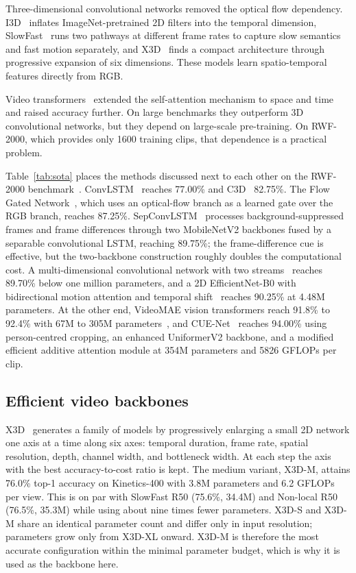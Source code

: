 \documentclass[conference]{IEEEtran}
\begin{document}
Three-dimensional convolutional networks removed the optical flow
dependency. I3D~\cite{i3d} inflates ImageNet-pretrained 2D filters
into the temporal dimension, SlowFast~\cite{slowfast} runs two
pathways at different frame rates to capture slow semantics and fast
motion separately, and X3D~\cite{x3d} finds a compact architecture
through progressive expansion of six dimensions. These models learn
spatio-temporal features directly from RGB.

Video transformers~\cite{timesformer,videoswin} extended the
self-attention mechanism to space and time and raised accuracy further.
On large benchmarks they outperform 3D convolutional networks, but they
depend on large-scale pre-training. On RWF-2000, which provides only
1600 training clips, that dependence is a practical problem.

Table~\ref{tab:sota} places the methods discussed next to each other
on the RWF-2000 benchmark~\cite{rwf2000}. ConvLSTM~\cite{convlstm}
reaches 77.00\% and C3D~\cite{c3d} 82.75\%. The Flow Gated
Network~\cite{rwf2000}, which uses an optical-flow branch as a learned
gate over the RGB branch, reaches 87.25\%.
SepConvLSTM~\cite{sepconvlstm} processes background-suppressed frames
and frame differences through two MobileNetV2 backbones fused by a
separable convolutional LSTM, reaching 89.75\%; the frame-difference
cue is effective, but the two-backbone construction roughly doubles the
computational cost. A multi-dimensional convolutional network with two
streams~\cite{mdcn} reaches 89.70\% below one million parameters, and
a 2D EfficientNet-B0 with bidirectional motion attention and temporal
shift~\cite{biltma} reaches 90.25\% at 4.48M parameters. At the other
end, VideoMAE vision transformers reach 91.8\% to 92.4\% with 67M to
305M parameters~\cite{videomae,mixvit}, and CUE-Net~\cite{cuenet}
reaches 94.00\% using person-centred cropping, an enhanced UniformerV2
backbone, and a modified efficient additive attention module at 354M
parameters and 5826 GFLOPs per clip.

\subsection{Efficient video backbones}

X3D~\cite{x3d} generates a family of models by progressively enlarging
a small 2D network one axis at a time along six axes: temporal
duration, frame rate, spatial resolution, depth, channel width, and
bottleneck width. At each step the axis with the best accuracy-to-cost
ratio is kept. The medium variant, X3D-M, attains 76.0\% top-1
accuracy on Kinetics-400 with 3.8M parameters and 6.2 GFLOPs per view.
This is on par with SlowFast R50 (75.6\%, 34.4M) and Non-local R50
(76.5\%, 35.3M) while using about nine times fewer parameters. X3D-S
and X3D-M share an identical parameter count and differ only in input
resolution; parameters grow only from X3D-XL onward. X3D-M is
therefore the most accurate configuration within the minimal parameter
budget, which is why it is used as the backbone here.
\end{document}
